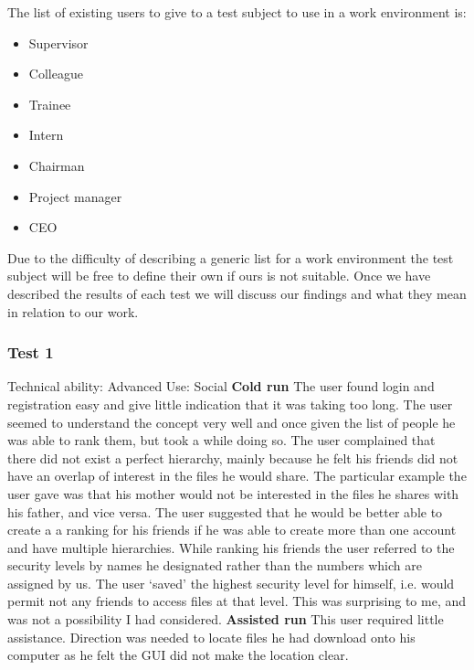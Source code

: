 \documentclass[12pt, titlepage]{article}
\begin{document}
The list of existing users to give to a test subject to use in a work environment is:
\begin{itemize}
	\item Supervisor
	\item Colleague
	\item Trainee
	\item Intern
	\item Chairman
	\item Project manager
	\item CEO
\end{itemize}
Due to the difficulty of describing a generic list for a work environment the test subject will be free to define their own if ours is not suitable.
\newline Once we have described the results of each test we will discuss our findings and what they mean in relation to our work.

\subsubsection{Test 1}
Technical ability: Advanced
\newline Use: Social
\newline
\newline \textbf{Cold run}
\newline The user found login and registration easy and give little indication that it was taking too long. The user seemed to understand the concept very well and once given the list of people he was able to rank them, but took a while doing so. The user complained that there did not exist a perfect hierarchy, mainly because he felt his friends did not have an overlap of interest in the files he would share. The particular example the user gave was that his mother would not be interested in the files he shares with his father, and vice versa. The user suggested that he would be better able to create a a ranking for his friends if he was able to create more than one account and have multiple hierarchies. While ranking his friends the user referred to the security levels by names he designated rather than the numbers which are assigned by us. The user `saved' the highest security level for himself, i.e. would permit not any friends to access files at that level. This was surprising to me, and was not a possibility I had considered.
\newline
\newline \textbf{Assisted run}
This user required little assistance. Direction was needed to locate files he had download onto his computer as he felt the GUI did not make the location clear.
\end{document}
